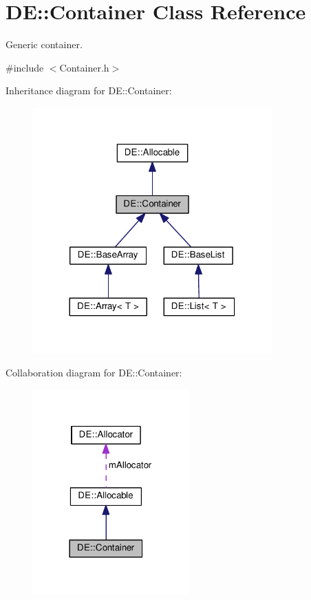 \hypertarget{classDE_1_1Container}{}\section{DE\+:\+:Container Class Reference}
\label{classDE_1_1Container}


Generic container.  




{\ttfamily \#include $<$Container.\+h$>$}



Inheritance diagram for DE\+:\+:Container\+:\nopagebreak
\begin{figure}[H]
\begin{center}
\leavevmode
\includegraphics[width=260pt]{classDE_1_1Container__inherit__graph}
\end{center}
\end{figure}


Collaboration diagram for DE\+:\+:Container\+:\nopagebreak
\begin{figure}[H]
\begin{center}
\leavevmode
\includegraphics[width=170pt]{classDE_1_1Container__coll__graph}
\end{center}
\end{figure}
